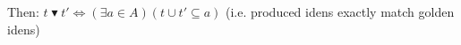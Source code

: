 \begin{claim}
Then: $t\blacktriangledown t' \Leftrightarrow (\exists a \in A) (t \cup t' \subseteq a)$ (i.e. produced \glspl{iden} exactly match golden \glspl{iden})



\end{claim}


